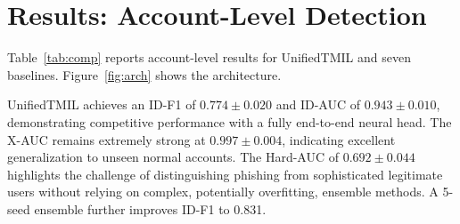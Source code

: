 \documentclass[conference]{IEEEtran}
\begin{document}
\section{Results: Account-Level Detection}
Table~\ref{tab:comp} reports account-level results for UnifiedTMIL and seven baselines. Figure~\ref{fig:arch} shows the architecture.

UnifiedTMIL achieves an ID-F1 of $0.774\pm0.020$ and ID-AUC of $0.943\pm0.010$, demonstrating competitive performance with a fully end-to-end neural head. The X-AUC remains extremely strong at $0.997\pm0.004$, indicating excellent generalization to unseen normal accounts. The Hard-AUC of $0.692\pm0.044$ highlights the challenge of distinguishing phishing from sophisticated legitimate users without relying on complex, potentially overfitting, ensemble methods. A 5-seed ensemble further improves ID-F1 to 0.831.

\begin{table}[!t]
\centering
\caption{Account-level phishing detection. ID = in-domain (BERT4ETH split); X = zero-shot cross-domain PTXPhish; $\text{X}_{\text{hard}}$ = AUC vs hard PTXPhish benign senders. Best results in \textbf{bold}.}
\label{tab:comp}
\end{table}
\end{document}
